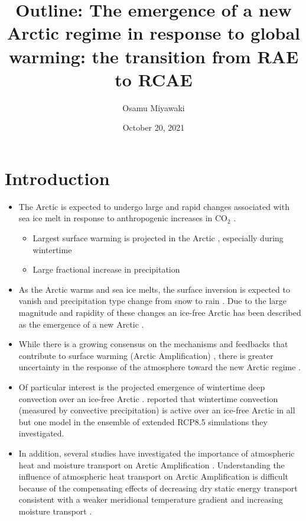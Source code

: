 \documentclass{article}
\title{Outline: The emergence of a new Arctic regime in response to global warming: the transition from RAE to RCAE}
\date{October 20, 2021}
\author{Osamu Miyawaki}
\begin{document}
\maketitle

\section*{Introduction}
\begin{itemize}
    \item The Arctic is expected to undergo large and rapid changes associated with sea ice melt in response to anthropogenic increases in CO$_2$ \citep{dai2019, feldl2020}.
    \begin{itemize}
        \item Largest surface warming is projected in the Arctic \citep[Arctic Amplification, e.g.][]{manabe1975, held1993a}, especially during wintertime \citep{lu2009}
        \item Large fractional increase in precipitation \citep{bintanja2014,siler2018}
    \end{itemize}
    \item As the Arctic warms and sea ice melts, the surface inversion is expected to vanish \citep{bintanja2012} and precipitation type change from snow to rain \citep{bintanja2017}. Due to the large magnitude and rapidity of these changes an ice-free Arctic has been described as the emergence of a new Arctic \citep{serreze2006, landrum2020}.
    \item While there is a growing consensus on the mechanisms and feedbacks that contribute to surface warming (Arctic Amplification) \citep[e.g.,][]{pithan2014, feldl2020}, there is greater uncertainty in the response of the atmosphere toward the new Arctic regime \citep{screen2018}.
    \item Of particular interest is the projected emergence of wintertime deep convection over an ice-free Arctic \citep{abbot2008a}. \cite{hankel2021} reported that wintertime convection (measured by convective precipitation) is active over an ice-free Arctic in all but one model in the ensemble of extended RCP8.5 simulations they investigated. 
    \item In addition, several studies have investigated the importance of atmospheric heat and moisture transport on Arctic Amplification \citep{graversen2006,graversen2008,hwang2011,woods2016}. Understanding the influence of atmospheric heat transport on Arctic Amplification is difficult because of the compensating effects of decreasing dry static energy transport consistent with a weaker meridional temperature gradient \citep{chemke2020} and increasing moisture transport \citep{hwang2011, graversen2016}.

\end{itemize}
\end{document}
